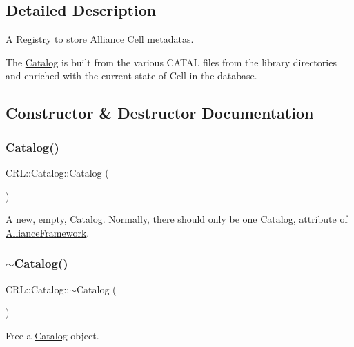 \subsection{Detailed Description}
A Registry to store Alliance Cell metadatas. 

The \mbox{\hyperlink{classCRL_1_1Catalog}{Catalog}} is built from the various C\+A\+T\+AL files from the library directories and enriched with the current state of Cell in the database. 

\subsection{Constructor \& Destructor Documentation}
\mbox{\label{classCRL_1_1Catalog_a6682f773880c7ca16bdca79057a08e6b}} 
\subsubsection{\texorpdfstring{Catalog()}{Catalog()}}
{\footnotesize\ttfamily C\+R\+L\+::\+Catalog\+::\+Catalog (\begin{DoxyParamCaption}{ }\end{DoxyParamCaption})\hspace{0.3cm}{\ttfamily [inline]}}

A new, empty, \mbox{\hyperlink{classCRL_1_1Catalog}{Catalog}}. Normally, there should only be one \mbox{\hyperlink{classCRL_1_1Catalog}{Catalog}}, attribute of \mbox{\hyperlink{classCRL_1_1AllianceFramework}{Alliance\+Framework}}. \mbox{\label{classCRL_1_1Catalog_a3ad457a2bf6246c3a1d9c3a4730c2696}} 
\subsubsection{\texorpdfstring{$\sim$\+Catalog()}{~Catalog()}}
{\footnotesize\ttfamily C\+R\+L\+::\+Catalog\+::$\sim$\+Catalog (\begin{DoxyParamCaption}{ }\end{DoxyParamCaption})}

Free a \mbox{\hyperlink{classCRL_1_1Catalog}{Catalog}} object. 

